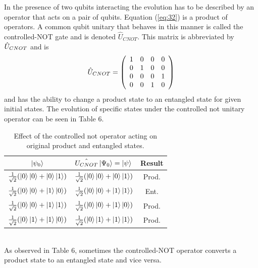 \documentclass[twocolumn]{article}
\begin{document}
In the presence of two qubits interacting the evolution has to be described by an operator that acts on a pair of qubits. Equation (\ref{eq:32}) is a product of operators. A common qubit unitary that behaves in this manner is called the controlled-NOT gate and is denoted $\hat{U}_{CNOT}$. This matrix is abbreviated by $\hat{U}_{\tiny{CNOT}}$ and is
\begin{equation} \label{eq:33}
\hat{U}_{\tiny{CNOT}}=
\left(\begin{array}{cccc}
1 & 0 & 0 & 0 \\
0 & 1 & 0 & 0 \\
0 & 0 & 0 & 1 \\
0 & 0 & 1 & 0 \\
\end{array}\right)
\end{equation}
and has the ability to change a product state to an entangled state for given initial states. The evolution of specific states under the controlled not unitary operator can be seen in Table 6.
\begin{table}[h!]
\begin{center}
\begin{tabular}{ |c|c|c| }
\hline $\ket{\psi_0}$ & $\hat{U_{CNOT}}\ket{\Psi_0}=\ket{\psi}$ & Result \\
\hline $\frac{1}{\sqrt{2}}(\ket{0}\ket{0}+\ket{0}\ket{1})$ & $\frac{1}{\sqrt{2}}(\ket{0}\ket{0}+\ket{0}\ket{1})$ & Prod. \\
\hline $\frac{1}{\sqrt{2}}(\ket{0}\ket{0}+\ket{1}\ket{0})$ & $\frac{1}{\sqrt{2}}(\ket{0}\ket{0}+\ket{1}\ket{1})$ & Ent. \\
\hline $\frac{1}{\sqrt{2}}(\ket{0}\ket{0}+\ket{1}\ket{1})$ & $\frac{1}{\sqrt{2}}(\ket{0}\ket{0}+\ket{1}\ket{0})$ & Prod. \\
\hline $\frac{1}{\sqrt{2}}(\ket{0}\ket{1}+\ket{1}\ket{0})$ & $\frac{1}{\sqrt{2}}(\ket{0}\ket{1}+\ket{1}\ket{1})$ & Prod. \\
\hline 
\end{tabular}
\caption{Effect of the controlled not operator acting on original product and entangled states.}
\end{center}
\end{table} \\
As observed in Table 6, sometimes the controlled-NOT operator converts a product state to an entangled state and vice versa.
\end{document}
